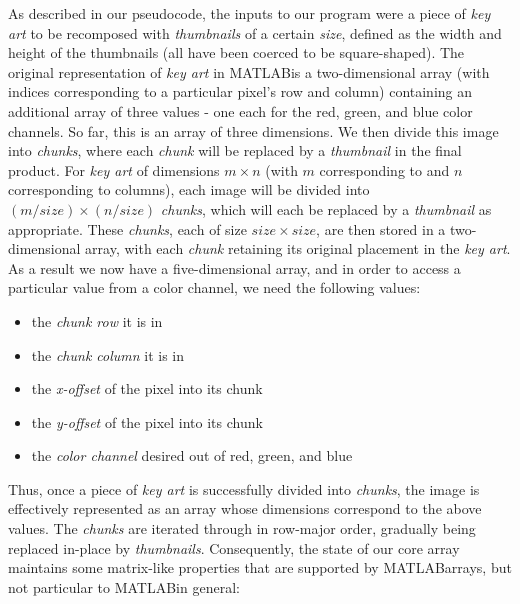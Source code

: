 \documentclass[11pt,conference]{IEEEtran}
\newcommand{\matlab}{MATLAB}
\theoremstyle{plain} %
\theoremstyle{definition}
\theoremstyle{remark}
\begin{document}
As described in our pseudocode, the inputs to our program were a piece of \textit{key art} to be recomposed with \textit{thumbnails} of a certain \textit{size}, defined as the width and height of the thumbnails (all have been coerced to be square-shaped). The original representation of \textit{key art} in \matlab is a two-dimensional array (with indices corresponding to a particular pixel's row and column) containing an additional array of three values - one each for the red, green, and blue color channels. So far, this is an array of three dimensions. We then divide this image into \textit{chunks}, where each \textit{chunk} will be replaced by a \textit{thumbnail} in the final product. For \textit{key art} of dimensions $m \times n$ (with $m$ corresponding to and $n$ corresponding to columns), each image will be divided into $(m / size) \times (n / size)$ \textit{chunks}, which will each be replaced by a \textit{thumbnail} as appropriate. These \textit{chunks}, each of size $size \times size$, are then stored in a two-dimensional array, with each \textit{chunk} retaining its original placement in the \textit{key art}. As a result we now have a five-dimensional array, and in order to access a particular value from a color channel, we need the following values:

\begin{itemize}
\item the \textit{chunk row} it is in
\item the \textit{chunk column} it is in
\item the \textit{x-offset} of the pixel into its chunk
\item the \textit{y-offset} of the pixel into its chunk
\item the \textit{color channel} desired out of red, green, and blue
\end{itemize}

Thus, once a piece of \textit{key art} is successfully divided into \textit{chunks}, the image is effectively represented as an array whose dimensions correspond to the above values. The \textit{chunks} are iterated through in row-major order, gradually being replaced in-place by \textit{thumbnails}. Consequently, the state of our core array maintains some matrix-like properties that are supported by \matlab\@ arrays, but not particular to \matlab\@ in general:
\end{document}
